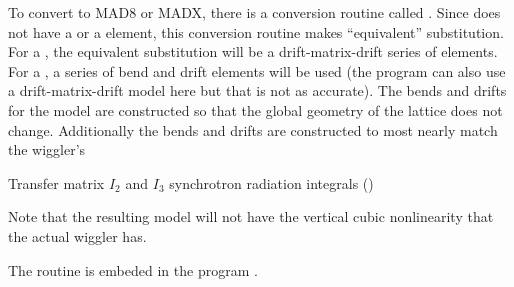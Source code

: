 To convert to MAD8 or MADX, there is a \bmad conversion routine called
.  Since \mad does not
have a  or a  element, this conversion routine makes ``equivalent''
substitution. For a , the equivalent substitution will be a drift-matrix-drift series
of elements. For a , a series of bend and drift elements will be used (the program can
also use a drift-matrix-drift model here but that is not as accurate). The bends and drifts for the
 model are constructed so that the global geometry of the lattice does not
change. Additionally the bends and drifts are constructed to most nearly match the wiggler's
\begin{example}
  Transfer matrix
  $I_2$ and $I_3$ synchrotron radiation integrals ()
\end{example}
Note that the resulting model will not have the vertical cubic
nonlinearity that the actual wiggler has.

The  routine is embeded in the program
.

